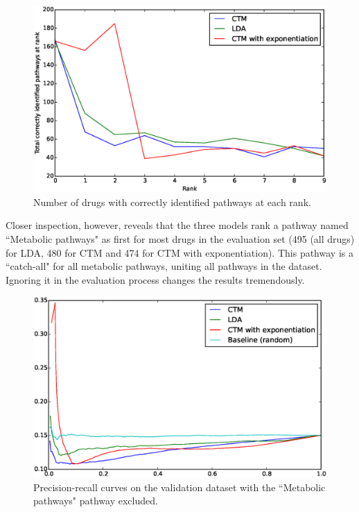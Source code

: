 \documentclass[12pt,a4paper,twoside,openright]{report}
\begin{document}
\begin{figure}[!htb]
\includegraphics[width=\textwidth]{ctd-side-plot-10.eps}
\caption{Number of drugs with correctly identified pathways at each rank.}
\label{fig:ctd-side-plot-10}
\end{figure}

Closer inspection, however, reveals that the three models rank a pathway named ``Metabolic pathways" as first for most drugs in the evaluation set (495 (all drugs) for LDA, 480 for CTM and 474 for CTM with exponentiation). This pathway is a ``catch-all" for all metabolic pathways, uniting all pathways in the dataset. Ignoring it in the evaluation process changes the results tremendously.

\begin{figure}[!htb]
\includegraphics[width=\textwidth]{ctd-pr-curves-no1100.eps}
\caption{Precision-recall curves on the validation dataset with the ``Metabolic pathways" pathway excluded.}
\label{fig:ctd-pr-curves-no1100}
\end{figure}
\end{document}
